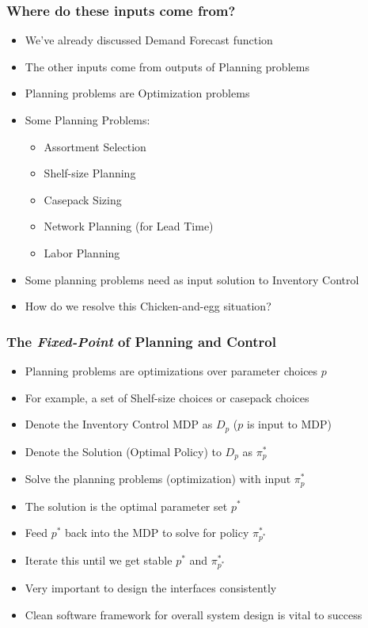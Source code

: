 \documentclass[handout]{beamer}
\begin{document}
\begin{frame}
\frametitle{Where do these inputs come from?}
\pause
\begin{itemize}[<+->]
\item We've already discussed Demand Forecast function
\item The other inputs come from outputs of Planning problems
\item Planning problems are Optimization problems
\item Some Planning Problems:
\begin{itemize}
\item Assortment Selection
\item Shelf-size Planning
\item Casepack Sizing
\item Network Planning (for Lead Time)
\item Labor Planning
\end{itemize}
\item Some planning problems need as input solution to Inventory Control
\item How do we resolve this Chicken-and-egg situation?
\end{itemize}
\end{frame}

\begin{frame}
\frametitle{The {\em Fixed-Point} of Planning and Control}
\pause
\begin{itemize}[<+->]
\item Planning problems are optimizations over parameter choices $p$
\item For example, a set of Shelf-size choices or casepack choices
\item Denote the Inventory Control MDP as $D_p$ ($p$ is input to MDP)
\item Denote the Solution (Optimal Policy) to $D_p$ as $\pi^*_p$
\item Solve the planning problems (optimization) with input $\pi^*_p$
\item The solution is the optimal parameter set $p^*$
\item Feed $p^*$ back into the MDP to solve for policy $\pi^*_{p^*}$
\item Iterate this until we get stable $p^*$ and $\pi^*_{p^*}$
\item Very important to design the interfaces consistently
\item Clean software framework for overall system design is vital to success
\end{itemize}
\end{frame}
\end{document}
